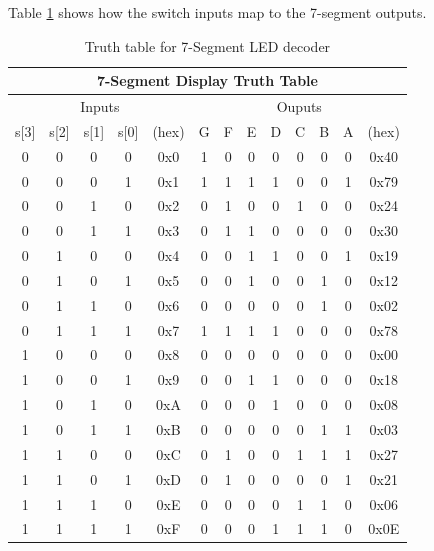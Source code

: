 \documentclass[11pt]{article}
\begin{document}
Table \ref{table:7seg_decoder} shows how the switch inputs map to the 7-segment outputs. \\


\begin{table}[h]
\centering
\begin{tabular}{|c|c|c|c|c|c|c|c|c|c|c|c|c|}
\hline
\multicolumn{13}{|c|}{7-Segment Display Truth Table}                                  \\ \hline
\multicolumn{5}{|c|}{Inputs}                      & \multicolumn{8}{c|}{Ouputs}       \\ \hline
s{[}3{]} & s{[}2{]} & s{[}1{]} & s{[}0{]} & (hex) & G & F & E & D & C & B & A & (hex) \\ \hline
0        & 0        & 0        & 0        & 0x0   & 1 & 0 & 0 & 0 & 0 & 0 & 0 & 0x40  \\ \hline
0        & 0        & 0        & 1        & 0x1   & 1 & 1 & 1 & 1 & 0 & 0 & 1 & 0x79  \\ \hline
0        & 0        & 1        & 0        & 0x2   & 0 & 1 & 0 & 0 & 1 & 0 & 0 & 0x24  \\ \hline
0        & 0        & 1        & 1        & 0x3   & 0 & 1 & 1 & 0 & 0 & 0 & 0 & 0x30  \\ \hline
0        & 1        & 0        & 0        & 0x4   & 0 & 0 & 1 & 1 & 0 & 0 & 1 & 0x19  \\ \hline
0        & 1        & 0        & 1        & 0x5   & 0 & 0 & 1 & 0 & 0 & 1 & 0 & 0x12  \\ \hline
0        & 1        & 1        & 0        & 0x6   & 0 & 0 & 0 & 0 & 0 & 1 & 0 & 0x02  \\ \hline
0        & 1        & 1        & 1        & 0x7   & 1 & 1 & 1 & 1 & 0 & 0 & 0 & 0x78  \\ \hline
1        & 0        & 0        & 0        & 0x8   & 0 & 0 & 0 & 0 & 0 & 0 & 0 & 0x00  \\ \hline
1        & 0        & 0        & 1        & 0x9   & 0 & 0 & 1 & 1 & 0 & 0 & 0 & 0x18  \\ \hline
1        & 0        & 1        & 0        & 0xA   & 0 & 0 & 0 & 1 & 0 & 0 & 0 & 0x08  \\ \hline
1        & 0        & 1        & 1        & 0xB   & 0 & 0 & 0 & 0 & 0 & 1 & 1 & 0x03  \\ \hline
1        & 1        & 0        & 0        & 0xC   & 0 & 1 & 0 & 0 & 1 & 1 & 1 & 0x27  \\ \hline
1        & 1        & 0        & 1        & 0xD   & 0 & 1 & 0 & 0 & 0 & 0 & 1 & 0x21  \\ \hline
1        & 1        & 1        & 0        & 0xE   & 0 & 0 & 0 & 0 & 1 & 1 & 0 & 0x06  \\ \hline
1        & 1        & 1        & 1        & 0xF   & 0 & 0 & 0 & 1 & 1 & 1 & 0 & 0x0E  \\ \hline
\end{tabular}
\caption{Truth table for 7-Segment LED decoder}
\label{table:7seg_decoder}
\end{table}
\end{document}

